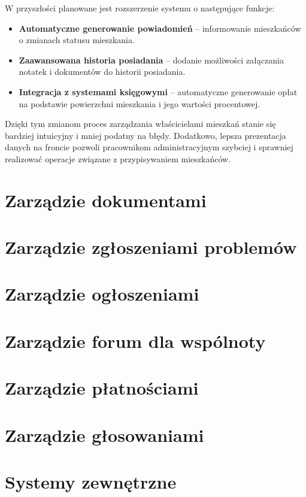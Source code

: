 W przyszłości planowane jest rozszerzenie systemu o następujące funkcje:
\begin{itemize}
    \item \textbf{Automatyczne generowanie powiadomień} -- informowanie mieszkańców o zmianach statusu mieszkania.
    \item \textbf{Zaawansowana historia posiadania} -- dodanie możliwości załączania notatek i dokumentów do historii posiadania.
    \item \textbf{Integracja z systemami księgowymi} -- automatyczne generowanie opłat na podstawie powierzchni mieszkania i jego wartości procentowej.
\end{itemize}

Dzięki tym zmianom proces zarządzania właścicielami mieszkań stanie się bardziej intuicyjny i mniej podatny na błędy. Dodatkowo, lepsza prezentacja danych na froncie pozwoli pracownikom administracyjnym szybciej i sprawniej realizować operacje związane z przypisywaniem mieszkańców.


\section{Zarządzie dokumentami}

\section{Zarządzie zgłoszeniami problemów}

\section{Zarządzie ogłoszeniami}

\section{Zarządzie forum dla wspólnoty}

\section{Zarządzie płatnościami}

\section{Zarządzie głosowaniami}

\section{Systemy zewnętrzne}




